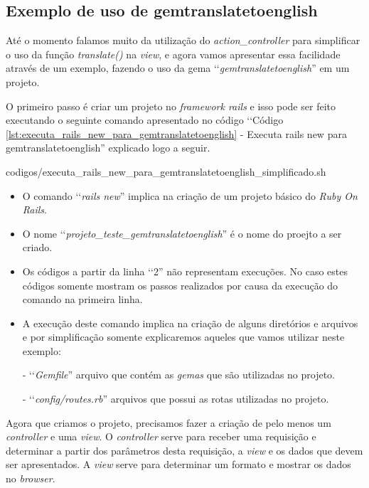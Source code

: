 \subsection{Exemplo de uso de gemtranslatetoenglish}
\label{subsection:exemplo_de_uso_de_gemtranslatetoenglish}

Até o momento falamos muito da utilização do \emph{action\_controller} para simplificar o uso da função 
\emph{translate()} na \emph{view}, e agora vamos apresentar essa facilidade através de um exemplo, 
fazendo o uso da gema ‘‘\emph{gemtranslatetoenglish}'' em um projeto.

O primeiro passo é criar um projeto no \emph{framework rails} e isso pode ser feito executando 
o seguinte comando apresentado no código ‘‘Código 
\ref{lst:executa_rails_new_para_gemtranslatetoenglish} - Executa rails new para gemtranslatetoenglish''
explicado logo a seguir.


{codigos/executa_rails_new_para_gemtranslatetoenglish_simplificado.sh} 

\begin{itemize}

 \item O comando ‘‘\emph{rails new}'' implica na criação de um projeto básico do \emph{Ruby On Rails}.
 
 \item O nome ‘‘\emph{projeto\_teste\_gemtranslatetoenglish}'' é o nome do proejto a ser criado.
 
  \item Os códigos a partir da linha ‘‘2'' não representam execuções. No caso estes códigos somente 
 mostram os passos realizados por causa da execução do comando na primeira linha.
 
 \item A execução deste comando implica na criação de alguns diretórios e arquivos e por simplificação 
 somente explicaremos aqueles que vamos utilizar neste exemplo:
  
  \subitem - ‘‘\emph{Gemfile}'' arquivo que contém as \emph{gemas} que são utilizadas no projeto.
 
  \subitem - ‘‘\emph{config/routes.rb}'' arquivos que possui as rotas utilizadas no projeto.
 
\end{itemize}

Agora que criamos o projeto, precisamos fazer a criação de pelo menos um \emph{controller} e uma \emph{view}.
O \emph{controller} serve para receber uma requisição e determinar a partir dos parâmetros desta 
requisição, a \emph{view} e os dados que devem ser apresentados. A \emph{view} serve para 
determinar um formato e mostrar os dados no \emph{browser}.

